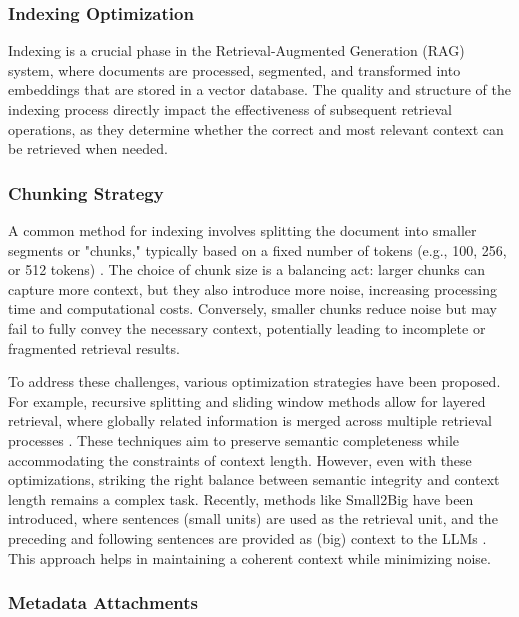 \subsubsection{Indexing Optimization}

Indexing is a crucial phase in the Retrieval-Augmented Generation (RAG) system, where documents are processed, segmented, and transformed into embeddings that are stored in a vector database. The quality and structure of the indexing process directly impact the effectiveness of subsequent retrieval operations, as they determine whether the correct and most relevant context can be retrieved when needed.

\subsubsection{Chunking Strategy}

A common method for indexing involves splitting the document into smaller segments or "chunks," typically based on a fixed number of tokens (e.g., 100, 256, or 512 tokens) \cite{teja2023chunk}. The choice of chunk size is a balancing act: larger chunks can capture more context, but they also introduce more noise, increasing processing time and computational costs. Conversely, smaller chunks reduce noise but may fail to fully convey the necessary context, potentially leading to incomplete or fragmented retrieval results.

To address these challenges, various optimization strategies have been proposed. For example, recursive splitting and sliding window methods allow for layered retrieval, where globally related information is merged across multiple retrieval processes \cite{langchain2023recursive}. These techniques aim to preserve semantic completeness while accommodating the constraints of context length. However, even with these optimizations, striking the right balance between semantic integrity and context length remains a complex task. Recently, methods like Small2Big have been introduced, where sentences (small units) are used as the retrieval unit, and the preceding and following sentences are provided as (big) context to the LLMs \cite{yang2023smalltobig}. This approach helps in maintaining a coherent context while minimizing noise.

\subsubsection{Metadata Attachments}

